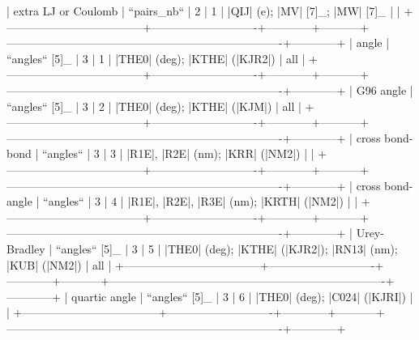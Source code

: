             | extra LJ or Coulomb                | ``pairs_nb``               | 2          | 1         | |QIJ| (e); |MV| [7]_; |MW| [7]_                                         |            | 
            +------------------------------------+----------------------------+------------+-----------+-------------------------------------------------------------------------+------------+
            | angle                              | ``angles`` [5]_            | 3          | 1         | |THE0| (deg); |KTHE| (|KJR2|)                                           | all        | 
            +------------------------------------+----------------------------+------------+-----------+-------------------------------------------------------------------------+------------+
            | G96 angle                          | ``angles`` [5]_            | 3          | 2         | |THE0| (deg); |KTHE| (|KJM|)                                            | all        | 
            +------------------------------------+----------------------------+------------+-----------+-------------------------------------------------------------------------+------------+
            | cross bond-bond                    | ``angles``                 | 3          | 3         | |R1E|, |R2E| (nm); |KRR| (|NM2|)                                        |            | 
            +------------------------------------+----------------------------+------------+-----------+-------------------------------------------------------------------------+------------+
            | cross bond-angle                   | ``angles``                 | 3          | 4         | |R1E|, |R2E|, |R3E| (nm); |KRTH| (|NM2|)                                |            | 
            +------------------------------------+----------------------------+------------+-----------+-------------------------------------------------------------------------+------------+
            | Urey-Bradley                       | ``angles`` [5]_            | 3          | 5         | |THE0| (deg); |KTHE| (|KJR2|); |RN13| (nm); |KUB| (|NM2|)               | all        |
            +------------------------------------+----------------------------+------------+-----------+-------------------------------------------------------------------------+------------+
            | quartic angle                      | ``angles`` [5]_            | 3          | 6         | |THE0| (deg); |C024| (|KJRI|)                                           |            | 
            +------------------------------------+----------------------------+------------+-----------+-------------------------------------------------------------------------+------------+
